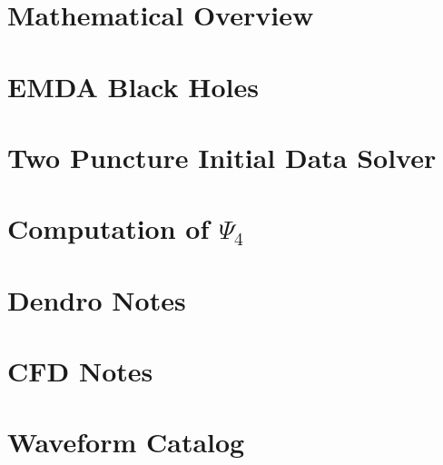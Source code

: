 \documentclass[etd,oneside,phd]{BYUPhys}
\begin{document}
\cleardoublepage
\begin{appendices}

\chapter{Mathematical Overview}
\label{app:math_overview}


\chapter{EMDA Black Holes}


\chapter{Two Puncture Initial Data Solver}


\chapter{Computation of \texorpdfstring{$\Psi_4$}{Psi4}}
\label{sec:appx:wave_extraction}


\chapter{Dendro Notes}


\chapter{CFD Notes}






\chapter{Waveform Catalog}


\end{appendices}




\printindex

 \printindex
\end{document}
